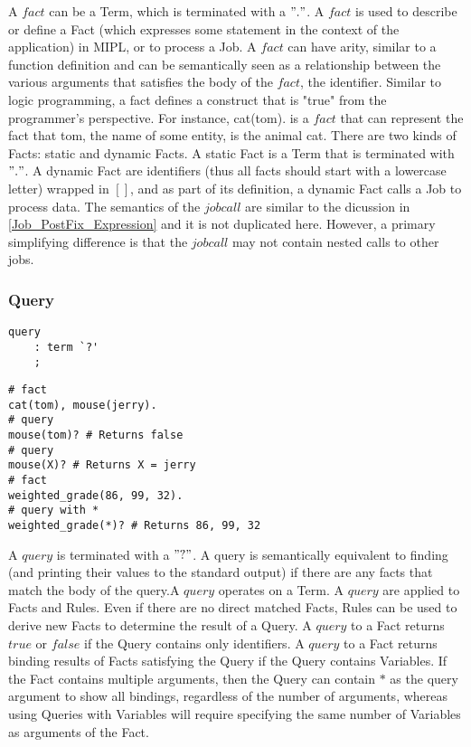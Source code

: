 \documentclass[prodmode,acmtecs]{acmsmall}
\begin{document}
A $fact$ can be a Term, which is terminated with a $"."$. A $fact$ is used to
describe or define a Fact (which expresses some statement in the context
of the application) in MIPL, or to process a Job. A $fact$ can have arity, similar to a function
definition and can be semantically seen as a relationship between the various arguments that satisfies
the body of the $fact$, the identifier. Similar to logic programming, 
a fact defines a construct that is "true" from the programmer's perspective. For instance, cat(tom). is a 
$fact$ that can represent the fact that tom, the name of some entity, is the animal cat. There are two kinds of
Facts: static and dynamic Facts. A static Fact is a Term that is terminated
with $"."$. A dynamic Fact are identifiers (thus all facts should start with a lowercase letter) wrapped in $[ ]$, and as part
of its definition, a dynamic Fact calls a Job to process data. The semantics
of the $jobcall$ are similar to the dicussion in \ref{Job_PostFix_Expression}
and it is not duplicated here. However, a primary  simplifying difference is that
the $jobcall$ may not contain nested calls to other jobs.
\medskip

\subsubsection{Query}
\begin{lstlisting}
query
	: term `?'		
	;
\end{lstlisting}

\begin{lstlisting}
# fact
cat(tom), mouse(jerry).
# query
mouse(tom)? # Returns false
# query
mouse(X)? # Returns X = jerry
# fact
weighted_grade(86, 99, 32).
# query with *
weighted_grade(*)? # Returns 86, 99, 32
\end{lstlisting}

A $query$ is terminated with a $"?"$. A query is semantically equivalent to finding 
(and printing their values to the standard output) if there are
any facts that match the body of the query.A $query$ operates on a Term. A $query$ 
are applied to Facts and Rules. Even if there are no direct matched Facts, Rules
can be used to derive new Facts to determine the result of a Query. A $query$ to 
a Fact returns $true$ or $false$ if the Query contains only identifiers. A $query$ 
to a Fact returns binding results of Facts satisfying the Query if the Query contains 
Variables. If the Fact contains multiple  arguments, then the Query can contain $*$
as the query argument to show all bindings, regardless of the number of arguments, 
whereas using Queries with Variables will require specifying the same number of 
Variables as arguments of the Fact.
\end{document}
